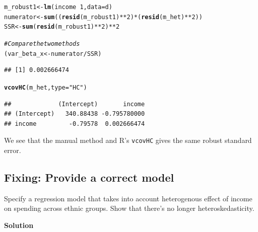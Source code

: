 \documentclass{article}\usepackage[]{graphicx}\usepackage[]{color}
\makeatletter
\newcommand{\hlnum}[1]{\textcolor[rgb]{0.686,0.059,0.569}{#1}}%
\newcommand{\hlstr}[1]{\textcolor[rgb]{0.192,0.494,0.8}{#1}}%
\newcommand{\hlcom}[1]{\textcolor[rgb]{0.678,0.584,0.686}{\textit{#1}}}%
\newcommand{\hlopt}[1]{\textcolor[rgb]{0,0,0}{#1}}%
\newcommand{\hlstd}[1]{\textcolor[rgb]{0.345,0.345,0.345}{#1}}%
\newcommand{\hlkwb}[1]{\textcolor[rgb]{0.69,0.353,0.396}{#1}}%
\newcommand{\hlkwc}[1]{\textcolor[rgb]{0.333,0.667,0.333}{#1}}%
\newcommand{\hlkwd}[1]{\textcolor[rgb]{0.737,0.353,0.396}{\textbf{#1}}}%
\newenvironment{kframe}{%
 \def\at@end@of@kframe{}%
 \ifinner\ifhmode%
  \def\at@end@of@kframe{\end{minipage}}%
  \begin{minipage}{\columnwidth}%
 \fi\fi%
 \def\FrameCommand##1{\hskip\@totalleftmargin \hskip-\fboxsep
 \colorbox{shadecolor}{##1}\hskip-\fboxsep
     \hskip-\linewidth \hskip-\@totalleftmargin \hskip\columnwidth}%
 \MakeFramed {\advance\hsize-\width
   \@totalleftmargin\z@ \linewidth\hsize
   \@setminipage}}%
 {\par\unskip\endMakeFramed%
 \at@end@of@kframe}
\newenvironment{knitrout}{}{} %
\makeatother
\begin{document}
\begin{knitrout}
\color{fgcolor}\begin{kframe}
\begin{alltt}
\hlstd{m_robust1} \hlkwb{<-} \hlkwd{lm}\hlstd{(income} \hlopt{~} \hlnum{1}\hlstd{,} \hlkwc{data} \hlstd{= d)}
\hlstd{numerator} \hlkwb{<-} \hlkwd{sum}\hlstd{((}\hlkwd{resid}\hlstd{(m_robust1)}\hlopt{**}\hlnum{2}\hlstd{)} \hlopt{*} \hlstd{(}\hlkwd{resid}\hlstd{(m_het)}\hlopt{**}\hlnum{2}\hlstd{))}
\hlstd{SSR} \hlkwb{<-} \hlkwd{sum}\hlstd{(}\hlkwd{resid}\hlstd{(m_robust1)}\hlopt{**}\hlnum{2}\hlstd{)} \hlopt{**} \hlnum{2}

\hlcom{# Compare the two methods}
\hlstd{(var_beta_x} \hlkwb{<-} \hlstd{numerator} \hlopt{/} \hlstd{SSR)}
\end{alltt}
\begin{verbatim}
## [1] 0.002666474
\end{verbatim}
\begin{alltt}
\hlkwd{vcovHC}\hlstd{(m_het,} \hlkwc{type} \hlstd{=} \hlstr{"HC"}\hlstd{)}
\end{alltt}
\begin{verbatim}
##             (Intercept)       income
## (Intercept)   340.88438 -0.795780000
## income         -0.79578  0.002666474
\end{verbatim}
\end{kframe}
\end{knitrout}

We see that the manual method and R's \verb`vcovHC` gives the same robust standard error.

\subsection{Fixing: Provide a correct model}

Specify a regression model that takes into account heterogenous effect of income on spending across ethnic groups. Show that there's no longer heteroskedasticity.

\textbf{Solution}
\end{document}
